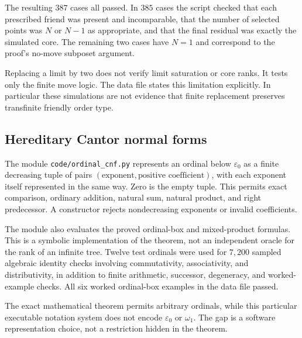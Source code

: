 \documentclass[11pt,letterpaper]{article}
\theoremstyle{definition}
\theoremstyle{remark}
\begin{document}
The resulting $387$ cases all passed. In $385$ cases the script checked
that each prescribed friend was present and incomparable, that the number
of selected points was $N$ or $N-1$ as appropriate, and that the final
residual was exactly the simulated core. The remaining two cases have
$N=1$ and correspond to the proof's no-move subposet argument.

Replacing a limit by two does not verify limit saturation or core ranks.
It tests only the finite move logic. The data file states this limitation
explicitly. In particular these simulations are not evidence that finite
replacement preserves transfinite friendly order type.

\subsection{Hereditary Cantor normal forms}
The module \texttt{code/ordinal\_cnf.py} represents an ordinal below
$\varepsilon_0$ as a finite decreasing tuple of pairs
$(\text{exponent},\text{positive coefficient})$, with each exponent itself
represented in the same way. Zero is the empty tuple. This permits exact
comparison, ordinary addition, natural sum, natural product, and right
predecessor. A constructor rejects nondecreasing exponents or invalid
coefficients.

The module also evaluates the proved ordinal-box and mixed-product
formulas. This is a symbolic implementation of the theorem, not an
independent oracle for the rank of an infinite tree. Twelve test ordinals
were used for $7{,}200$ sampled algebraic identity checks involving
commutativity, associativity, and distributivity, in addition to finite
arithmetic, successor, degeneracy, and worked-example checks. All six
worked ordinal-box examples in the data file passed.

The exact mathematical theorem permits arbitrary ordinals, while this
particular executable notation system does not encode $\varepsilon_0$ or
$\omega_1$. The gap is a software representation choice, not a restriction
hidden in the theorem.
\end{document}
